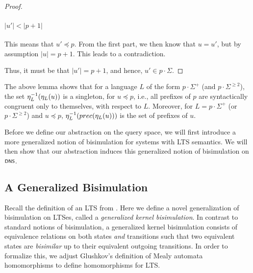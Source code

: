 \begin{proof}
	\paragraph{$|u'| < |p + 1|$}
	This means that $u' \preceq p$. From the first part, we then know that $u = u'$, but by assumption $|u| = p + 1$. This leads to a contradiction.
	
	Thus, it must be that $|u'| = p+1$, and hence, $u' \in p\cdot\Sigma$.
\end{proof}

The above lemma shows that for a language $L$ of the form $p\cdot\Sigma^+$ (and $p\cdot\Sigma^{\geq 2}$), the set $\eta_{L}^{-1}(\eta_{L}(u))$ is a singleton, for $u \preceq p$, i.e., all prefixes of $p$ are syntactically congruent only to themselves, with respect to $L$. Moreover, for $L = p\cdot\Sigma^+$ (or $p\cdot\Sigma^{\geq 2}$) and $u \preceq p$, $\eta_{L}^{-1}(prec(\eta_{L}(u)))$ is the set of prefixes of $u$.

Before we define our abstraction on the query space, we will first introduce a more generalized notion of bisimulation for systems with LTS semantics. We will then show that our abstraction induces this generalized notion of bisimulation on $\scrsf{DNS}$.


\subsection{A Generalized Bisimulation}\label{subsec:gen-ker-bis}

Recall the definition of an LTS from  . Here we define a novel generalization of bisimulation on LTSes, called a \emph{generalized kernel bisimulation}. In contrast to standard notions of bisimulation, a generalized kernel bisimulation consists of equivalence relations on both states \emph{and} transitions such that two equivalent states are \emph{bisimilar} up to their equivalent outgoing transitions. In order to formalize this, we adjust Glushkov's  definition of Mealy automata homomorphisms %
\cite[p. 3]{glushkov1961abstract}
to define homomorphisms for LTS.

